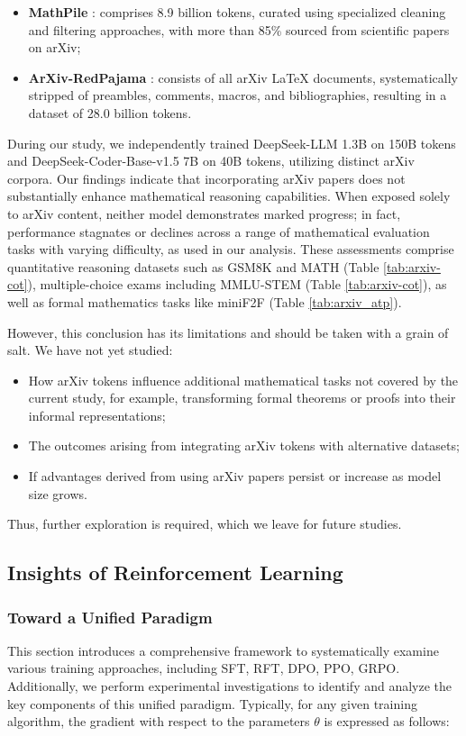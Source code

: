 \begin{itemize}[topsep=0pt]
\begin{itemize}[topsep=0pt]
\begin{itemize}[topsep=0pt]
    \item \textbf{MathPile} \citep{mathpile}: comprises 8.9 billion tokens, curated using specialized cleaning and filtering approaches, with more than 85\% sourced from scientific papers on arXiv;
    \item \textbf{ArXiv-RedPajama} \citep{redpajama}: consists of all arXiv LaTeX documents, systematically stripped of preambles, comments, macros, and bibliographies, resulting in a dataset of 28.0 billion tokens.
\end{itemize}

During our study, we independently trained DeepSeek-LLM 1.3B on 150B tokens and DeepSeek-Coder-Base-v1.5 7B on 40B tokens, utilizing distinct arXiv corpora. Our findings indicate that incorporating arXiv papers does not substantially enhance mathematical reasoning capabilities. When exposed solely to arXiv content, neither model demonstrates marked progress; in fact, performance stagnates or declines across a range of mathematical evaluation tasks with varying difficulty, as used in our analysis. These assessments comprise quantitative reasoning datasets such as GSM8K and MATH (Table \ref{tab:arxiv-cot}), multiple-choice exams including MMLU-STEM (Table \ref{tab:arxiv-cot}), as well as formal mathematics tasks like miniF2F (Table \ref{tab:arxiv_atp}).

However, this conclusion has its limitations and should be taken with a grain of salt. We have not yet studied:

\begin{itemize}[topsep=0pt]
    \item How arXiv tokens influence additional mathematical tasks not covered by the current study, for example, transforming formal theorems or proofs into their informal representations;
    \item The outcomes arising from integrating arXiv tokens with alternative datasets;
    \item If advantages derived from using arXiv papers persist or increase as model size grows.
\end{itemize}

Thus, further exploration is required, which we leave for future studies.

\subsection{Insights of Reinforcement Learning}
\subsubsection{Toward a Unified Paradigm} This section introduces a comprehensive framework to systematically examine various training approaches, including SFT, RFT, DPO, PPO, GRPO. Additionally, we perform experimental investigations to identify and analyze the key components of this unified paradigm. Typically, for any given training algorithm, the gradient with respect to the parameters $\theta$ is expressed as follows:


\end{itemize}
\end{itemize}
